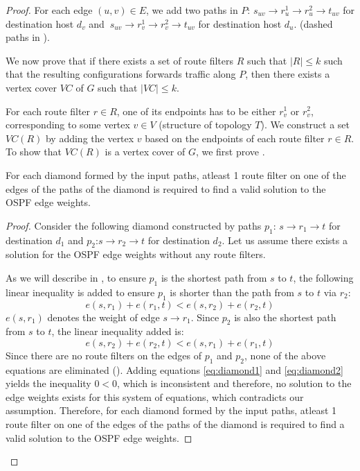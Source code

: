 \begin{proof}
For each edge $(u,v) \in E$, we add two paths in $P$: 
$s_{uv} \rightarrow r_u^1 \rightarrow r_u^2 \rightarrow t_{uv}$
for destination host $d_v$ and 
$~s_{uv} \rightarrow r_v^1 \rightarrow r_v^2 \rightarrow t_{uv}$ 
for destination host $d_u$.
(dashed paths in ). 

We now prove that if there exists a set of route filters
$R$ such that $|R| \leq k$ such that the resulting configurations
forwards traffic along $P$, then there exists a vertex cover $VC$
of $G$ such that $|VC| \leq k$. 

For each route filter $r \in R$, one of its endpoints 
has to be either $r_v^1$ or $r_v^2$, corresponding
to some vertex $v \in V$ (structure of topology $T$). 
We construct a set $VC(R)$ by adding the vertex $v$ 
based on the endpoints of each route filter $r \in R$.
To show that $VC(R)$ is a vertex cover of $G$, we first
prove .

\begin{lemma} \label{lemma:diamond}
	 For each diamond formed by the input paths, atleast 1 
	 route filter on one of the edges of the paths of the diamond 
	 is required to find a valid solution to the
	 OSPF edge weights.  
\end{lemma}

\begin{proof}
Consider the following diamond %
constructed by paths $p_1$: $s \rightarrow r_1 \rightarrow t$ 
for destination $d_1$ and $p_2$:$s \rightarrow r_2 \rightarrow t$ 
for destination $d_2$. Let us assume there exists a solution 
for the OSPF edge weights without any route filters. 

As we will describe in , 
to ensure $p_1$ is the shortest path from $s$ to $t$, the following
linear inequality is added to ensure $p_1$ is shorter than the
path from $s$ to $t$ via $r_2$: 
\begin{equation} \label{eq:diamond1}
	e(s,r_1) + e(r_1, t) < e(s, r_2) + e(r_2,t)
\end{equation}
$e(s,r_1)$ denotes the weight of edge $s \rightarrow r_1$.
Since $p_2$ is also the shortest path from $s$ 
to $t$, the linear inequality added is:
\begin{equation}  \label{eq:diamond2}
e(s,r_2) + e(r_2, t) < e(s, r_1) + e(r_1,t)
\end{equation}
Since there are no route filters on the edges
of $p_1$ and $p_2$, none of the above equations are 
eliminated (). 
Adding equations \ref{eq:diamond1} and  \ref{eq:diamond2} 
yields the inequality $0 < 0$, which is inconsistent 
and therefore, no solution to 
the edge weights exists for this system of equations, 
which contradicts our assumption. Therefore,
for each diamond formed by the input paths, atleast 1 
route filter on one of the edges of the paths of the diamond 
is required to find a valid solution to the
OSPF edge weights.  
\end{proof}


\end{proof}
